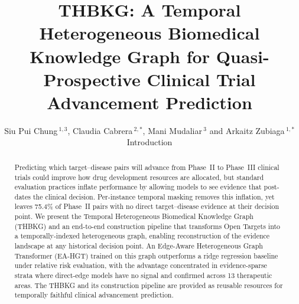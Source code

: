 \documentclass[a4,center]{NAR}
\begin{document}
\title{THBKG: A Temporal Heterogeneous Biomedical Knowledge Graph for Quasi-Prospective Clinical Trial Advancement Prediction}

\author{%
Siu Pui Chung\,$^{1,3}$,
Claudia Cabrera\,$^{2,*}$,
Mani Mudaliar\,$^{3}$
and Arkaitz Zubiaga\,$^{1,*}$%


\address{%
$^{1}$School of Electronic Engineering and Computer Science, Queen Mary
University of London, United Kingdom,
$^{2}$Clinical Pharmacology, William Harvey Research Institute, Barts and
The London School of Medicine and Dentistry, Queen Mary University of
London, London, United Kingdom
and
$^{3}$Recursion Pharmaceuticals Inc, Salt Lake City, UT 84101, USA}


\maketitle

\begin{abstract}
Predicting which target--disease pairs will advance from Phase~II to
Phase~III clinical trials could improve how drug development resources
are allocated, but standard evaluation practices inflate performance by
allowing models to see evidence that post-dates the clinical decision.
Per-instance temporal masking removes this inflation, yet leaves 75.4\%
of Phase~II pairs with no direct target--disease evidence at their
decision point. We present the Temporal Heterogeneous Biomedical
Knowledge Graph (THBKG) and an end-to-end construction pipeline that
transforms Open Targets into a temporally-indexed heterogeneous graph,
enabling reconstruction of the evidence landscape at any historical
decision point. An Edge-Aware Heterogeneous Graph Transformer (EA-HGT)
trained on this graph outperforms a ridge regression baseline under
relative risk evaluation, with the advantage concentrated in
evidence-sparse strata where direct-edge models have no signal and
confirmed across 13 therapeutic areas. The THBKG and its construction
pipeline are provided as reusable resources for temporally faithful
clinical advancement prediction.
\end{abstract}


\section{Introduction}

}
\end{document}
